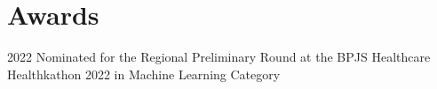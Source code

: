 \documentclass[12pt,letterpaper]{report}
\newcommand{\listitemspace}{0.25em}
\renewenvironment{itemize}
{\begin{list}{}{\setlength{\leftmargin}{0em}
                \setlength{\parskip}{0em}
                \setlength{\itemsep}{\listitemspace}
                \setlength{\parsep}{\listitemspace}}}
{\end{list}}
\begin{document}


    \section*{Awards}
    \begin{tablist}
        \item[2022] \tab{}Nominated for the Regional Preliminary Round at the BPJS Healthcare Healthkathon 2022 in Machine Learning Category
    \end{tablist}



\end{document}
